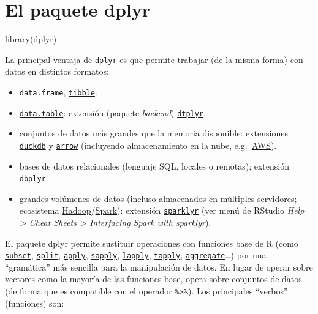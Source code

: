 \documentclass[
]{book}
\newenvironment{Shaded}{\begin{snugshade}}{\end{snugshade}}
\newcommand{\FunctionTok}[1]{\textcolor[rgb]{0.00,0.00,0.00}{#1}}
\newcommand{\NormalTok}[1]{#1}
\theoremstyle{break}
\theoremstyle{nonumberplain}
\begin{document}
\hypertarget{dplyr-pkg}{%
\section{El paquete dplyr}\label{dplyr-pkg}}

\begin{Shaded}
\begin{Highlighting}[]
\FunctionTok{library}\NormalTok{(dplyr)}
\end{Highlighting}
\end{Shaded}

La principal ventaja de \href{https://dplyr.tidyverse.org/index.html}{\texttt{dplyr}} es que permite trabajar (de la misma forma) con datos en distintos formatos:

\begin{itemize}
\item
  \texttt{data.frame}, \href{https://tibble.tidyverse.org/}{\texttt{tibble}}.
\item
  \href{https://rdatatable.gitlab.io/data.table}{\texttt{data.table}}: extensión (paquete \emph{backend}) \href{https://dtplyr.tidyverse.org}{\texttt{dtplyr}}.
\item
  conjuntos de datos más grandes que la memoria disponible: extensiones \href{https://duckdb.org/docs/api/r}{\texttt{duckdb}} y \href{https://arrow.apache.org/docs/r/}{\texttt{arrow}} (incluyendo almacenamiento en la nube, e.g.~\href{https://aws.amazon.com/es/s3}{AWS}).
\item
  bases de datos relacionales (lenguaje SQL, locales o remotas); extensión \href{https://dbplyr.tidyverse.org}{\texttt{dbplyr}}.
\item
  grandes volúmenes de datos (incluso almacenados en múltiples servidores; ecosistema \href{http://hadoop.apache.org/}{Hadoop}/\href{https://spark.apache.org/}{Spark}): extensión \href{https://spark.rstudio.com}{\texttt{sparklyr}} (ver menú de RStudio \emph{Help \textgreater{} Cheat Sheets \textgreater{} Interfacing Spark with sparklyr}).
\end{itemize}

El paquete dplyr permite sustituir operaciones con funciones base de R (como \href{NA}{\texttt{subset}}, \href{NA}{\texttt{split}}, \href{NA}{\texttt{apply}}, \href{NA}{\texttt{sapply}}, \href{NA}{\texttt{lapply}}, \href{NA}{\texttt{tapply}}, \href{NA}{\texttt{aggregate}}\ldots) por una ``gramática'' más sencilla para la manipulación de datos.
En lugar de operar sobre vectores como la mayoría de las funciones base,
opera sobre conjuntos de datos (de forma que es compatible con el operador \texttt{\%\textgreater{}\%}).
Los principales ``verbos'' (funciones) son:
\end{document}
